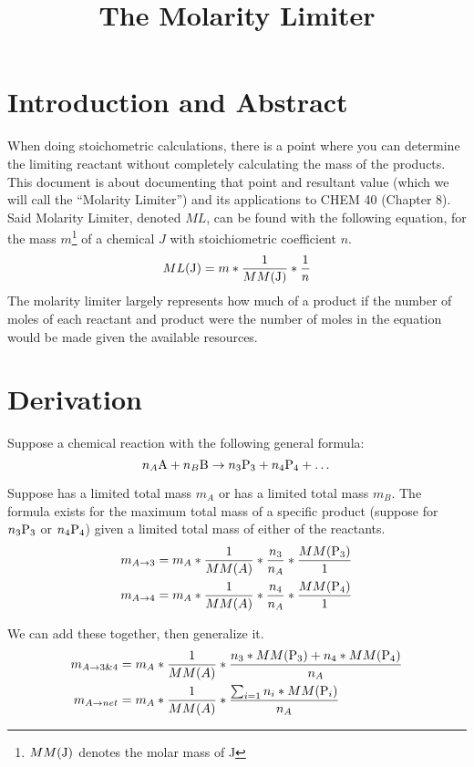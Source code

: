 \documentclass[11pt]{article}
\begin{document}
\title{The Molarity Limiter}
\author{}
\date{}
\maketitle

\section{Introduction and Abstract}
When doing stoichometric calculations, there is a point where you can determine the limiting reactant without completely calculating the mass of the products.
This document is about documenting that point and resultant value (which we will call the ``Molarity Limiter'') and its applications to CHEM 40 (Chapter 8).
Said Molarity Limiter, denoted $ML$, can be found with the following equation, for the mass $m$\footnote{$MM(\ce{J})$ denotes the molar mass of J} of a chemical $J$ with stoichiometric coefficient $n$.
\begin{equation}
    ML(\ce{J}) = m * \frac{1}{MM(\ce{J})} * \frac{1}{n}
\end{equation}
The molarity limiter largely represents how much of a product if the number of moles of each reactant and product were the number of moles in the equation would be made given the available resources. 

\section{Derivation}
Suppose a chemical reaction with the following general formula:
\begin{equation}
    n_A\ce{A} + n_B\ce{B} \to n_3\ce{P_3} + n_4\ce{P_4} + \dots
\end{equation}

Suppose  has a limited total mass $m_A$ or  has a limited total mass $m_B$. 
The formula exists for the maximum total mass of a specific product (suppose for $n_3\ce{P_3}$ or $n_4\ce{P_4}$) given a limited total mass of either of the reactants.
\begin{align}
    m_{A \to 3} &=  m_A * \frac{1}{MM(A)} * \frac{n_3}{n_A} * \frac{MM(\ce{P_3})}{1}\\
    m_{A \to 4} &=  m_A * \frac{1}{MM(A)} * \frac{n_4}{n_A} * \frac{MM(\ce{P_4})}{1}
\end{align}

We can add these together, then generalize it.
\begin{align}
    m_{A \to 3\&4}  &=  m_A * \frac{1}{MM(A)} * \frac{n_3 * MM(\ce{P_3}) + n_4 * MM(\ce{P_4})}{n_A}\\
    m_{A \to net}   &=  m_A * \frac{1}{MM(A)} * \frac{\sum_{i = 1} n_i * MM(\ce{P_i})}{n_A}
\end{align}
\end{document}
